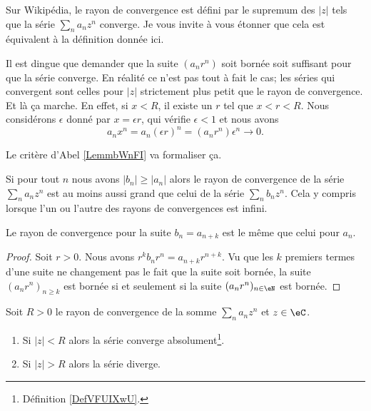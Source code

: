\begin{normaltext}
	Sur Wikipédia\cite{BIBooRVNCooAKQeld}, le rayon de convergence est défini par le supremum des \( | z |\) tels que la série \( \sum_na_nz^n\) converge. Je vous invite à vous étonner que cela est équivalent à la définition donnée ici.

	Il est dingue que demander que la suite \( (a_nr^n)\) soit bornée soit suffisant pour que la série converge. En réalité ce n'est pas tout à fait le cas; les séries qui convergent sont celles pour \( | z |\) strictement plus petit que le rayon de convergence. Et là ça marche. En effet, si \( x<R\), il existe un \( r\) tel que \( x<r<R\). Nous considérons \( \epsilon\) donné par  \( x=\epsilon r\), qui vérifie \( \epsilon<1\) et nous avons
	\begin{equation}
		a_nx^n=a_n(\epsilon r)^n=(a_nr^n)\epsilon^n\to 0.
	\end{equation}

	Le critère d'Abel \ref{LemmbWnFI} va formaliser ça.
\end{normaltext}

\begin{remark}      \label{REMooYOTEooKvxHSf}
	Si pour tout \( n\) nous avons \( | b_n |\geq | a_n |\) alors le rayon de convergence de la série \( \sum_na_nz^n\) est au moins aussi grand que celui de la série \( \sum_nb_nz^n\). Cela y compris lorsque l'un ou l'autre des rayons de convergences est infini.
\end{remark}

\begin{lemma}    \label{LEMooVCTNooCQHkzs}
	Le rayon de convergence pour la suite \( b_n=a_{n+k}\) est le même que celui pour \( a_n\).
\end{lemma}

\begin{proof}
	Soit \( r>0\). Nous avons \( r^kb_nr^n=a_{n+k}r^{n+k}\). Vu que les \( k\) premiers termes d'une suite ne changement pas le fait que la suite soit bornée, la suite \( (a_nr^n)_{n\geq k}\) est bornée si et seulement si la suite \( (a_nr^n)_{n\in \eN}\) est bornée.
\end{proof}

\begin{lemma}   \label{LemmbWnFI}
	Soit \( R>0\) le rayon de convergence de la somme \( \sum_na_nz^n\) et \( z\in \eC\).
	\begin{enumerate}
		\item
		      Si \( | z |<R\) alors la série converge absolument\footnote{Définition \ref{DefVFUIXwU}.}.
		\item
		      Si \( | z |>R\) alors la série diverge.
	\end{enumerate}
\end{lemma}

